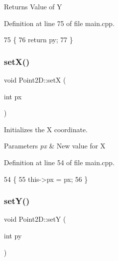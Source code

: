 \begin{DoxyReturn}{Returns}
Value of Y 
\end{DoxyReturn}


Definition at line 75 of file main.\+cpp.


\begin{DoxyCode}
75                      \{
76         \textcolor{keywordflow}{return} py;
77     \}
\end{DoxyCode}
\mbox{\label{classPoint2D_af268842e8f2e6072ffe345dc2f322046}} 
\subsubsection{\texorpdfstring{set\+X()}{setX()}}
{\footnotesize\ttfamily void Point2\+D\+::setX (\begin{DoxyParamCaption}\item[{int}]{px }\end{DoxyParamCaption})\hspace{0.3cm}{\ttfamily [inline]}}



Initializes the X coordinate. 


\begin{DoxyParams}{Parameters}
{\em px} & New value for X \\
\hline
\end{DoxyParams}


Definition at line 54 of file main.\+cpp.


\begin{DoxyCode}
54                       \{
55         this->px = px;
56     \}
\end{DoxyCode}
\mbox{\label{classPoint2D_a0e08240b54e6eaae92c979082da1c91c}} 
\subsubsection{\texorpdfstring{set\+Y()}{setY()}}
{\footnotesize\ttfamily void Point2\+D\+::setY (\begin{DoxyParamCaption}\item[{int}]{py }\end{DoxyParamCaption})\hspace{0.3cm}{\ttfamily [inline]}}



